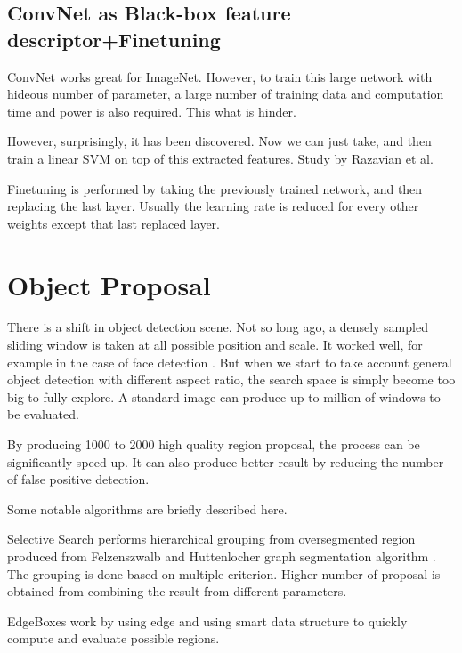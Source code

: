 \documentclass[a4paper,11pt]{kth-mag}
\begin{document}
\subsection{ConvNet as Black-box feature descriptor+Finetuning}
ConvNet works great for ImageNet. However, to train this large network with hideous number of parameter, a large number of training data and computation time and power is also required. This what is hinder.

However, surprisingly, it has been discovered. Now we can just take, and then train a linear SVM on top of this extracted features.
Study by Razavian et al. \cite{razavian}

Finetuning is performed by taking the previously trained network, and then replacing the last layer. Usually the learning rate is reduced for every other weights except that last replaced layer.

\section{Object Proposal}
There is a shift in object detection scene. Not so long ago, a densely sampled sliding window is taken at all possible position and scale. It worked well, for example in the case of face detection \cite{violajones}. But when we start to take account general object detection with different aspect ratio, the search space is simply become too big to fully explore. A standard image can produce up to million of windows to be evaluated.

By producing 1000 to 2000 high quality region proposal, the process can be significantly speed up. It can also produce better result by reducing the number of false positive detection.

Some notable algorithms are briefly described here. 



Selective Search \cite{selectivesearch} performs hierarchical grouping from oversegmented region produced from Felzenszwalb and Huttenlocher graph segmentation algorithm \cite{felzenszwalb}. The grouping is done based on multiple criterion. Higher number of proposal is obtained from combining the result from different parameters.

EdgeBoxes work by using edge and using smart data structure to quickly compute and evaluate possible regions.
\end{document}
